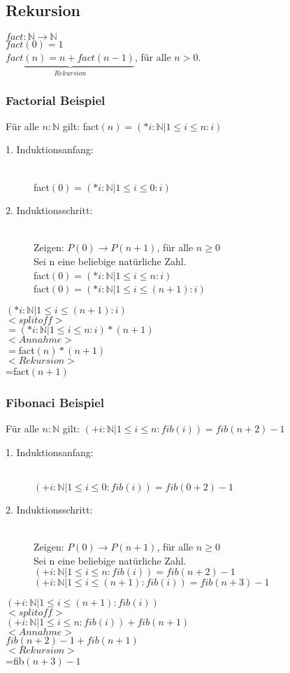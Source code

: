 \documentclass[a4paper,10pt]{article}
\newcommand{\NN}{\mathbb{N}} %
\newcommand{\ra}{\rightarrow}
\begin{document}
\subsection{Rekursion}
$fact: \NN \rightarrow \NN$ \\
$fact(0) = 1$ \\
$\underbrace{fact(n) = n+fact(n-1)}_{Rekursion}$, f\"ur alle $n>0$.

\subsubsection{Factorial Beispiel}
F\"ur alle $n:\NN$ gilt: fact$(n)=(*i:\NN | 1 \leq i \leq n : i)$
\begin{description}
	\item[1. Induktionsanfang:] \hfill \\
		fact$(0) = (*i : \NN | 1 \leq i \leq 0 : i)$
	\item[2. Induktionsschritt:] \hfill \\
		Zeigen: $P(0)\ra P(n+1)$, f\"ur alle $n \geq 0$ \\ 
		Sei n eine beliebige nat\"urliche Zahl. \\
		fact$(0) = (*i : \NN | 1 \leq i \leq n : i)$ \\
		fact$(0) = (*i : \NN | 1 \leq i \leq (n+1) : i)$
\end{description}
$(*i : \NN | 1 \leq i \leq (n+1) : i)$ \\ $<splitoff>$ \\
$=(*i : \NN | 1 \leq i \leq n : i) * (n+1)$ \\ $<Annahme>$ \\
$=$fact$(n)*(n+1)$ \\ $<Rekursion>$ \\
=fact$(n+1)$

\subsubsection{Fibonaci Beispiel}
F\"ur alle $n:\NN$ gilt: $(+ i: \NN | 1 \leq i \leq n : fib(i))=fib(n+2)-1$
\begin{description}
	\item[1. Induktionsanfang:] \hfill \\
		$(+ i: \NN | 1 \leq i \leq 0 : fib(i))=fib(0+2)-1$
	\item[2. Induktionsschritt:] \hfill \\
		Zeigen: $P(0)\ra P(n+1)$, f\"ur alle $n \geq 0$ \\ 
		Sei n eine beliebige nat\"urliche Zahl. \\
		$(+ i: \NN | 1 \leq i \leq n : fib(i))=fib(n+2)-1$ \\
		$(+ i: \NN | 1 \leq i \leq (n+1) : fib(i))=fib(n+3)-1$
\end{description}
$(+ i: \NN | 1 \leq i \leq (n+1) : fib(i))$ \\ $<splitoff>$ \\
$(+ i: \NN | 1 \leq i \leq n: fib(i)) +fib(n+1) $  \\ $<Annahme>$ \\
$fib(n+2)-1 + fib(n+1) $  \\ $<Rekursion>$ \\
=fib$(n+3)-1$
\end{document}

